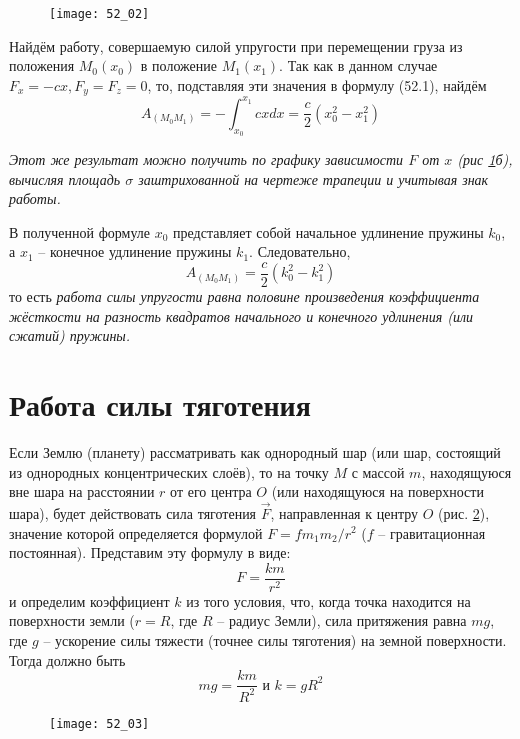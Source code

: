 \begin{figure}[h!]
    \texttt{[image: 52\_02]}
    \parbox{.47\textwidth}{\caption{} \label{pic52_02}}
\end{figure}

Найдём работу, совершаемую силой упругости при перемещении груза из 
положения \( M_0(x_0) \) в положение \( M_1(x_1) \). Так как в данном 
случае \( F_x = -cx, F_y = F_z = 0 \), то, подставляя эти значения в 
формулу (52.1), найдём
\[ 
    A_{(M_0 M_1)} = - \int_{x_0}^{x_1} cxdx = 
    \frac{c}{2} \left( x^{2}_0 - x^{2}_1 \right) 
\]

\emph{Этот же результат можно получить по графику зависимости 
\( F \) от \( x \) (рис \ref{pic52_02}б), вычисляя площадь \( \sigma \) 
заштрихованной на чертеже трапеции и учитывая знак работы.}

В полученной формуле \( x_0 \) представляет собой начальное удлинение 
пружины \( k_0 \), а \( x_1 \) -- конечное удлинение пружины \( k_1 \). 
Следовательно, 
\[ A_{(M_0 M_1)} = \frac{c}{2} \left( k^{2}_0 - k^{2}_1 \right) \]
то есть \emph{работа силы упругости равна половине произведения 
коэффициента жёсткости на разность квадратов начального и конечного 
удлинения (или сжатий) пружины.}

\section{Работа силы тяготения}
Если Землю (планету) рассматривать как однородный шар (или шар, 
состоящий из однородных концентрических слоёв), то на точку \( M \) с 
массой \( m \), находящуюся вне шара на расстоянии \( r \) от его 
центра \( O \) (или находящуюся на поверхности шара), будет действовать 
сила тяготения \( \vec{F} \), направленная к центру \( O \) (рис. \ref{pic52_03}), 
значение которой определяется формулой \( F = fm_1 m_2 / r^2 \) 
(\( f \) -- гравитационная постоянная). Представим эту формулу в виде: 
\[ F = \frac{km}{r^2} \]
и определим коэффициент \( k \) из того условия, что, когда точка 
находится на поверхности земли (\( r = R \), где \( R \) -- радиус Земли), 
сила притяжения равна \( mg \), где \( g \) -- ускорение силы тяжести 
(точнее силы тяготения) на земной поверхности. Тогда должно быть
\[ mg = \frac{km}{R^2} \text{ и } k = gR^2 \]

\begin{figure}[h!]
    \texttt{[image: 52\_03]}
    \parbox{.47\textwidth}{\caption{} \label{pic52_03}}
\end{figure}

